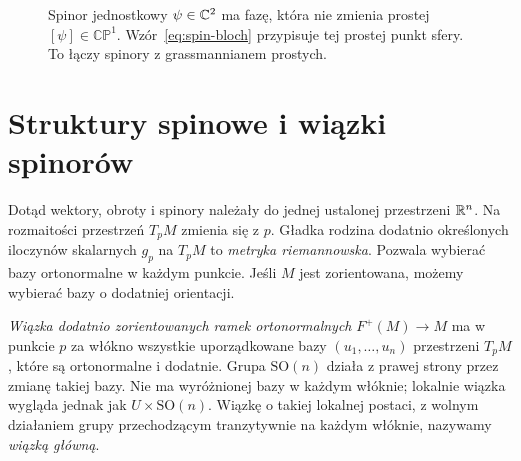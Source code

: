 \begin{figure}[!htbp]
\centering
{}
\caption{Spinor jednostkowy $\psi\in\mathbb{C}^2$ ma fazę,
która nie zmienia prostej $[\psi]\in\mathbb{CP}^1$.
Wzór~\eqref{eq:spin-bloch} przypisuje tej prostej
punkt sfery. To łączy spinory z grassmannianem prostych.}
\label{fig:spin-bloch}
\end{figure}

\section{Struktury spinowe i wiązki spinorów}
\label{sec:struktura-spinowa}

Dotąd wektory, obroty i spinory należały do jednej
ustalonej przestrzeni $\mathbb{R}^n$. Na rozmaitości
przestrzeń $T_pM$ zmienia się z $p$.
Gładka rodzina dodatnio określonych iloczynów
skalarnych $g_p$ na $T_pM$ to \emph{metryka
riemannowska}. Pozwala wybierać bazy ortonormalne
w każdym punkcie. Jeśli $M$ jest zorientowana,
możemy wybierać bazy o dodatniej orientacji.

\emph{Wiązka dodatnio zorientowanych ramek
ortonormalnych} $F^+(M)\to M$ ma w punkcie $p$
za włókno wszystkie uporządkowane bazy
$(u_1,\ldots,u_n)$ przestrzeni $T_pM$,
które są ortonormalne i dodatnie.
Grupa $\mathrm{SO}(n)$ działa z prawej strony
przez zmianę takiej bazy. Nie ma wyróżnionej
bazy w każdym włóknie; lokalnie wiązka wygląda
jednak jak $U\times\mathrm{SO}(n)$.
Wiązkę o takiej lokalnej postaci, z wolnym
działaniem grupy przechodzącym tranzytywnie
na każdym włóknie, nazywamy \emph{wiązką główną}.

